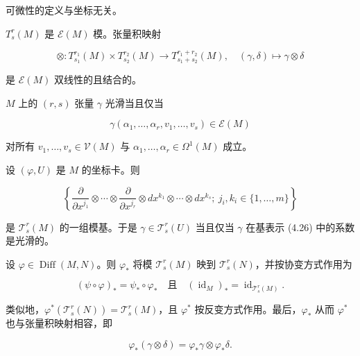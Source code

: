 \begin{remark}

\begin{items}
\item

可微性的定义与坐标无关。

\item

$ T_{s}^{r}(M) $ 是 $ \mathcal{E}(M) $ 模。张量积映射

\[
\otimes: T_{s_1}^{r_1}(M) \times T_{s_2}^{r_2}(M) \to T_{s_1+s_2}^{r_1+r_2}(M) , \quad (\gamma, \delta) \mapsto \gamma \otimes \delta
\]

是 $ \mathcal{E}(M) $ 双线性的且结合的。

\item

$ M $ 上的 $ (r,s) $ 张量 $ \gamma $ 光滑当且仅当

\[
\gamma(\alpha_1, \ldots, \alpha_r, v_1, \ldots, v_s) \in \mathcal{E}(M)
\]

对所有 $ v_1, \ldots, v_s \in \mathcal{V}(M) $ 与 $ \alpha_1, \ldots, \alpha_r \in \Omega^{1}(M) $ 成立。

\item

设 $ (\varphi, U) $ 是 $ M $ 的坐标卡。则

\begin{equation}
\left\{ \frac{\partial}{\partial x^{j_{1}}} \otimes \cdots \otimes \frac{\partial}{\partial x^{j_{r}}} \otimes dx^{k_{1}} \otimes \cdots \otimes dx^{k_{s}} ;\ j_{i}, k_{i} \in \{1, \ldots, m\} \right\}\tag{4.26}
\end{equation}

是 $ \mathcal{T}_s^r(M) $ 的一组模基。于是 $ \gamma \in \mathcal{T}_s^r(U) $ 当且仅当 $ \gamma $ 在基表示 (4.26) 中的系数是光滑的。

\item

设 $ \varphi \in \operatorname{Diff}(M, N) $。则 $ \varphi_* $ 将模 $ \mathcal{T}_s^r(M) $ 映到 $ \mathcal{T}_s^r(N) $，并按协变方式作用为

\[
(\psi \circ \varphi)_* = \psi_* \circ \varphi_* \quad \text{且} \quad (\operatorname{id}_M)_* = \operatorname{id}_{\mathcal{T}_s^r(M)} .
\]

类似地，$ \varphi^*(\mathcal{T}_s^r(N)) = \mathcal{T}_s^r(M) $，且 $ \varphi^* $ 按反变方式作用。最后，$ \varphi_* $ 从而 $ \varphi^* $ 也与张量积映射相容，即

\[
\varphi_*(\gamma \otimes \delta) = \varphi_*\gamma \otimes \varphi_*\delta .
\]
\item


\end{items}
\end{remark}
